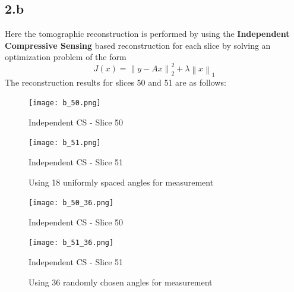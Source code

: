 \documentclass[12pt]{article}
\newcommand{\norm}[1]{\left\lVert #1 \right\rVert}
\begin{document}
\subsection*{2.b}
Here the tomographic reconstruction is performed by using the \textbf{Independent Compressive Sensing} based reconstruction for each slice by solving an optimization problem of the form
$$J(x) = \norm{y - Ax}_2^2 + \lambda \norm{x}_1$$
The reconstruction results for slices 50 and 51 are as follows:
\begin{figure}[ht]
	\centering
	\begin{minipage}[bt]{0.5\linewidth}
		\centering
		\texttt{[image: b\_50.png]}
		\caption*{Independent CS - Slice 50}
	\end{minipage}
	\begin{minipage}[bt]{0.4\linewidth}
		\centering
		\texttt{[image: b\_51.png]}
		\caption*{Independent CS - Slice 51}
	\end{minipage}
\caption{Using 18 uniformly spaced angles for measurement}
\end{figure}
\begin{figure}[ht]
	\centering
	\begin{minipage}[bt]{0.5\linewidth}
		\centering
		\texttt{[image: b\_50\_36.png]}
		\caption*{Independent CS - Slice 50}
	\end{minipage}
	\begin{minipage}[bt]{0.4\linewidth}
		\centering
		\texttt{[image: b\_51\_36.png]}
		\caption*{Independent CS - Slice 51}
	\end{minipage}
	\caption{Using 36 randomly chosen angles for measurement}
\end{figure}
\newpage
\end{document}
